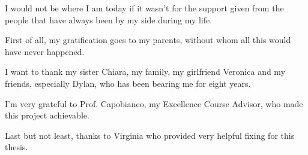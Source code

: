 \documentclass[Lau,oneside,noexaminfo]{sapthesis} %
\begin{document}
\begin{acknowledgments}
I would not be where I am today if it wasn't for the support given from the people that have always been by my side during my life.

First of all, my gratification goes to my parents, without whom all this would have never happened.

I want to thank my sister Chiara, my family, my girlfriend Veronica and my friends, especially Dylan, who has been bearing me for eight years.

I'm very grateful to Prof. Capobianco, my Excellence Course Advisor, who made this project achievable.

Last but not least, thanks to Virginia who provided very helpful fixing for this thesis.
\end{acknowledgments}
\end{document}
